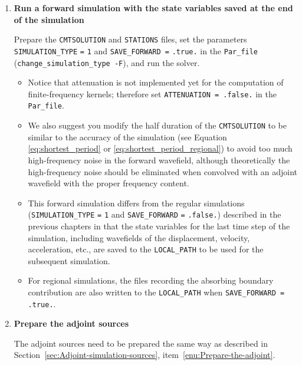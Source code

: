 \documentclass[oneside,english]{book}
\begin{document}
\begin{enumerate}
\item \textbf{Run a forward simulation with the state variables saved at
the end of the simulation}


Prepare the \texttt{\small CMTSOLUTION} and \texttt{\small STATIONS}
files, set the parameters \texttt{\small SIMULATION\_TYPE}{\small{}
}\texttt{\small =}{\small{} }\texttt{\small 1} and \texttt{\small SAVE\_FORWARD
=}{\small{} }\texttt{\small .true.} in the \texttt{Par\_file} (\texttt{change\_simulation\_type
-F}), and run the solver.

\begin{itemize}
\item Notice that attenuation is not implemented yet for the computation
of finite-frequency kernels; therefore set \texttt{ATTENUATION = .false.}
in the \texttt{Par\_file}.
\item We also suggest you modify the half duration of the \texttt{CMTSOLUTION}
to be similar to the accuracy of the simulation (see Equation \ref{eq:shortest_period}
or \ref{eq:shortest_period_regional}) to avoid too much high-frequency
noise in the forward wavefield, although theoretically the high-frequency
noise should be eliminated when convolved with an adjoint wavefield
with the proper frequency content.
\item This forward simulation differs from the regular simulations (\texttt{\small SIMULATION\_TYPE}{\small{}
}\texttt{\small =}{\small{} }\texttt{\small 1} and \texttt{\small SAVE\_FORWARD}{\small{}
}\texttt{\small =}{\small{} }\texttt{\small .false.}) described in
the previous chapters in that the state variables for the last time
step of the simulation, including wavefields of the displacement,
velocity, acceleration, etc., are saved to the \texttt{LOCAL\_PATH}
to be used for the subsequent simulation.
\item For regional simulations, the files recording the absorbing boundary
contribution are also written to the \texttt{LOCAL\_PATH} when \texttt{SAVE\_FORWARD
= .true.}.
\end{itemize}
\item \textbf{Prepare the adjoint sources}


The adjoint sources need to be prepared the same way as described
in Section~\ref{sec:Adjoint-simulation-sources}, item~\ref{enu:Prepare-the-adjoint}.


\end{enumerate}
\end{document}
